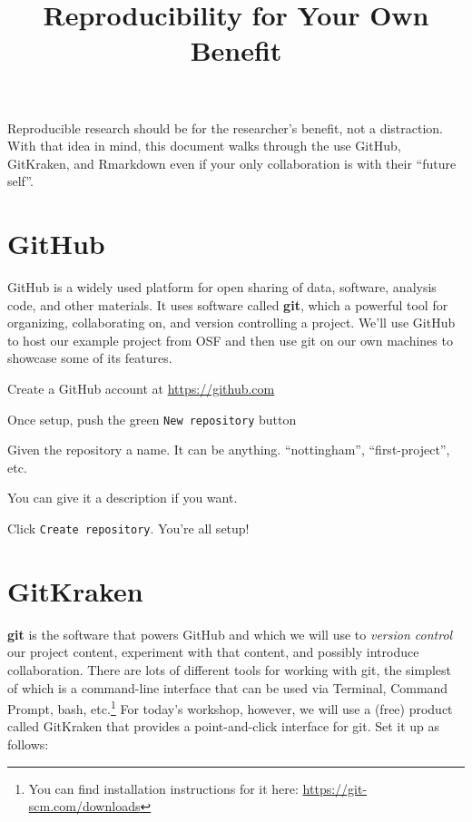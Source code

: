 \documentclass[12pt, a4paper]{article}
\title{Reproducibility for Your Own Benefit}
\date{}
\begin{document}
\vspace{-4em}

\maketitle

\vspace{-3em}

Reproducible research should be for the researcher's benefit, not a distraction. With that idea in mind, this document walks through the use GitHub, GitKraken, and Rmarkdown even if your only collaboration is with their ``future self''.

\section{GitHub}

GitHub is a widely used platform for open sharing of data, software, analysis code, and other materials. It uses software called \textbf{git}, which a powerful tool for organizing, collaborating on, and version controlling a project. We'll use GitHub to host our example project from OSF and then use git on our own machines to showcase some of its features.

\begin{enumerate*}
\item Create a GitHub account at \url{https://github.com}
\item Once setup, push the green \texttt{New repository} button
\item Given the repository a name. It can be anything. ``nottingham'', ``first-project'', etc.
\item You can give it a description if you want.
\item Click \texttt{Create repository}. You're all setup!
\end{enumerate*}

\section{GitKraken}

\textbf{git} is the software that powers GitHub and which we will use to \textit{version control} our project content, experiment with that content, and possibly introduce collaboration. There are lots of different tools for working with git, the simplest of which is a command-line interface that can be used via Terminal, Command Prompt, bash, etc.\footnote{You can find installation instructions for it here: \url{https://git-scm.com/downloads}} For today's workshop, however, we will use a (free) product called GitKraken that provides a point-and-click interface for git. Set it up as follows:
\end{document}
